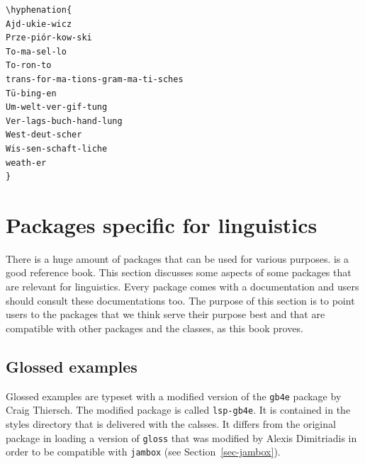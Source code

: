 \begin{verbatim}
\hyphenation{
Ajd-ukie-wicz
Prze-piór-kow-ski
To-ma-sel-lo
To-ron-to
trans-for-ma-tions-gram-ma-ti-sches
Tü-bing-en
Um-welt-ver-gif-tung
Ver-lags-buch-hand-lung
West-deut-scher
Wis-sen-schaft-liche
weath-er
}
\end{verbatim}

%



\section{Packages specific for linguistics}

There is a huge amount of packages that can be used for various purposes.  is a good
reference book. This section discusses some aspects of some packages that are relevant for
linguistics. Every \latex package comes with a documentation and users should consult these
documentations too. The purpose of this section is to point users to the packages that we think
serve their purpose best and that are compatible with other packages and the \lsp classes, as this
book proves.

\subsection{Glossed examples}

Glossed examples are typeset with a modified version of the \texttt{gb4e} package by Craig
Thiersch. The modified package is called \texttt{lsp-gb4e}. It is contained in the styles directory
that is delivered with the \lsp \latex calsses. It differs from the original package in loading a
version of \texttt{gloss} that was modified by Alexis Dimitriadis in order to be compatible with
\texttt{jambox} (see Section~\ref{sec-jambox}).

